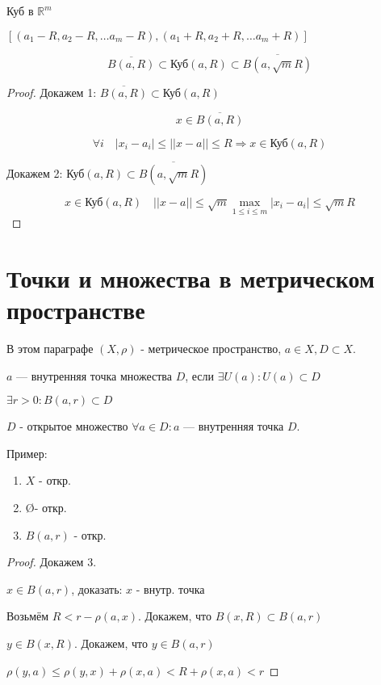 \begin{definition}
    Куб в $\mathbb{R}^m$

    $[(a_1-R,a_2-R,\ldots a_m-R), (a_1+R,a_2+R,\ldots a_m+R)]$
\end{definition}

$$\overline{B(a,R)}\subset\text{Куб}(a,R)\subset \overline{B(a,\sqrt mR)}$$

\begin{proof}
    Докажем 1: $\overline{B(a,R)}\subset\text{Куб}(a,R)$

    $$x\in \overline{B(a,R)}$$

    $$\forall i \quad |x_i-a_i|\leq ||x-a||\leq R \Rightarrow x\in\text{Куб}(a,R)$$

    Докажем 2: $\text{Куб}(a,R)\subset \overline{B(a,\sqrt mR)}$

    $$x\in\text{Куб}(a,R)\quad ||x-a||\leq\sqrt m \max\limits_{1\leq i\leq m} |x_i-a_i|\leq \sqrt mR$$
\end{proof}

\section{Точки и множества в метрическом пространстве}

В этом параграфе $(X,\rho)$ - метрическое пространство, $a\in X, D\subset X$.

\begin{definition}
    $a$ --- внутренняя точка множества $D$, если $\exists U(a) : U(a)\subset D$

    $\exists r>0 : B(a,r)\subset D$
\end{definition}

\begin{definition}
    $D$ - открытое множество $\forall a\in D : a$ --- внутренняя точка $D$. 
\end{definition}

Пример:
\begin{enumerate}
    \itemsep0em
    \item $X$ - откр.
    \item \O - откр.
    \item $B(a,r)$ - откр.
\end{enumerate}

\begin{proof}
    Докажем 3.

    $x\in B(a,r)$, доказать: $x$ - внутр. точка

    Возьмём $R<r-\rho(a,x)$. Докажем, что $B(x,R)\subset B(a,r)$

    $y\in B(x,R)$. Докажем, что $y\in B(a,r)$

    $\rho(y,a)\leq\rho(y,x)+\rho(x,a)<R+\rho(x,a)<r$
\end{proof}

